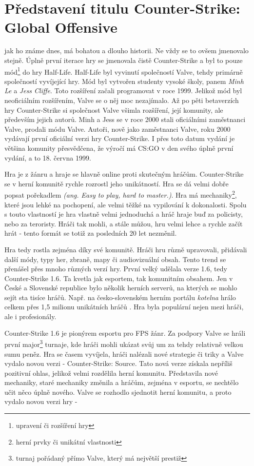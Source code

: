 \section{Představení titulu Counter-Strike: Global Offensive}
 jak ho známe dnes, má bohatou a dlouho historii. Ne vždy se to ovšem jmenovalo stejně. Úplně první iterace hry se jmenovala čistě Counter-Strike a byl to pouze mód\footnote{upravení či rozšíření hry} do
hry Half-Life. Half-Life byl vyvinutí společností Valve, tehdy primárně společností vyvíjející hry. Mód byl vytvořen studenty vysoké školy, panem \textit{Minh Le} a \textit{Jess Cliffe}. Toto rozšíření začali programovat
v roce 1999. Jelikož mód byl neoficiálním rozšířením, Valve se o něj moc nezajímalo. Až po pěti betaverzích hry Counter-Strike si společnost Valve všimla rozšíření, její komunity, ale především jejich autorů. Minh a Jess
se v roce 2000 stali oficiálními zaměstnanci Valve, prodali  módu Valve. Autoři, nově jako zaměstnanci Valve, roku 2000 vydávají první oficiální verzi hry Counter-Strike. I přes toto 
datum vydání je většina komunity přesvědčena, že výročí má \ac{CS:GO} v den svého úplně první vydání, a to 18. června 1999.

Hra je z žánru  a hraje se hlavně online proti skutečným hráčům. Counter-Strike se v herní komunitě rychle rozrostl jeho unikátností. Hra se dá velmi dobře popsat pořekadlem
\textit{ (ang. Easy to play, hard to master.)}. Hra má mechaniky\footnote{herní prvky či unikátní vlastnosti}, které jsou lehké na pochopení, ale velmi těžké na vypilování k dokonalosti.
Spolu s touto vlastností je hra vlastně velmi jednoduchá a hráč hraje buď za policisty, nebo za teroristy. Hráči tak mohli, a stále můžou, hru velmi lehce a rychle začít hrát - tento formát se totiž za posledních 20 let nezměnil. 

Hra tedy rostla zejména díky své komunitě. Hráči hru různě upravovali, přidávali další módy, typy her, zbraně, mapy či audiovizuální obsah. Tento trend se přenášel přes mnoho různých verzí hry. První velký  udělala
verze 1.6, tedy Counter-Strike 1.6. Ta kvetla jak esportem, tak komunitním obsahem. Jen v České a Slovenské republice bylo několik herních serverů, na kterých se mohlo sejít sta tisíce hráčů. Např. na česko-slovenském 
herním portálu \textit{kotelna} hrálo celkem přes 1,5 milionu unikátních hráčů \cite{csko2021}. Hra byla populární nejen mezi  hráči, ale i profesionály.

Counter-Strike 1.6 je pionýrem esportu pro \ac{FPS} žánr. Za podpory Valve se hráli první major\footnote{turnaj pořádaný přímo Valve, který má největší prestiž} turnaje, kde hráči mohli ukázat svůj um za tehdy relativně velkou
sumu peněz. Hra se časem vyvíjela, hráči nalézali nové strategie či triky a Valve vydalo novou verzi - Counter-Strike: Source. Tato nová verze získala nepříliš pozitivní ohlas, jelikož velmi rozdělila herní komunitu. Představila 
nové mechaniky, staré mechaniky změnila a hráčům, zejména v esportu, se nechtělo učit něco úplně nového. Valve se rozhodlo sjednotit herní komunitu, a proto vydalo novou verzi hry - 

